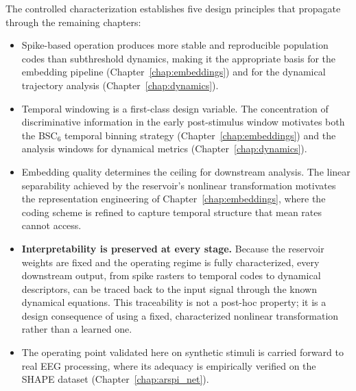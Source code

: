 The controlled characterization establishes five design principles that propagate through the remaining chapters:
\begin{itemize}
    \item Spike-based operation produces more stable and reproducible population codes than subthreshold dynamics, making it the appropriate basis for the embedding pipeline (Chapter~\ref{chap:embeddings}) and for the dynamical trajectory analysis (Chapter~\ref{chap:dynamics}).
    \item Temporal windowing is a first-class design variable. The concentration of discriminative information in the early post-stimulus window motivates both the BSC$_6$ temporal binning strategy (Chapter~\ref{chap:embeddings}) and the analysis windows for dynamical metrics (Chapter~\ref{chap:dynamics}).
    \item Embedding quality determines the ceiling for downstream analysis. The linear separability achieved by the reservoir's nonlinear transformation motivates the representation engineering of Chapter~\ref{chap:embeddings}, where the coding scheme is refined to capture temporal structure that mean rates cannot access.
    \item \textbf{Interpretability is preserved at every stage.} Because the reservoir weights are fixed and the operating regime is fully characterized, every downstream output, from spike rasters to temporal codes to dynamical descriptors, can be traced back to the input signal through the known dynamical equations. This traceability is not a post-hoc property; it is a design consequence of using a fixed, characterized nonlinear transformation rather than a learned one.
    \item The operating point validated here on synthetic stimuli is carried forward to real EEG processing, where its adequacy is empirically verified on the SHAPE dataset (Chapter~\ref{chap:arspi_net}).
\end{itemize}

